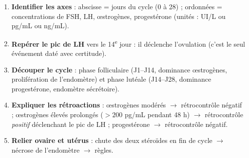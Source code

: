 \documentclass[11pt]{article}
\newcommand{\cle}[1]{{\popxbold\color{popdark}#1}}
\begin{document}
\begin{methode}
\begin{enumerate}
\item \textbf{Identifier les axes} : abscisse = jours du cycle (0 à 28) ; ordonnées = concentrations de FSH, LH, \oe{}strogènes, progestérone (unités : UI/L ou pg/mL ou ng/mL).
\item \textbf{Repérer le pic de LH} vers le 14\textsuperscript{e} jour : il déclenche l'\cle{ovulation} (c'est le seul événement daté avec certitude).
\item \textbf{Découper le cycle} : phase folliculaire (J1--J14, dominance \oe{}strogènes, prolifération de l'endomètre) et phase lutéale (J14--J28, dominance progestérone, endomètre sécrétoire).
\item \textbf{Expliquer les rétroactions} : \oe{}strogènes modérés $\rightarrow$ rétrocontrôle négatif ; \oe{}strogènes élevés prolongés ($>200$ pg/mL pendant 48 h) $\rightarrow$ rétrocontrôle \emph{positif} déclenchant le pic de LH ; progestérone $\rightarrow$ rétrocontrôle négatif.
\item \textbf{Relier ovaire et utérus} : chute des deux stéroïdes en fin de cycle $\rightarrow$ nécrose de l'endomètre $\rightarrow$ règles.
\end{enumerate}
\end{methode}
\end{document}
